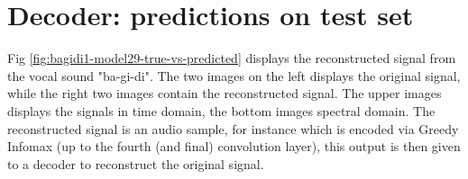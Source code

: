 \section{Decoder: predictions on test set}
Fig \ref{fig:bagidi1-model29-true-vs-predicted} displays the reconstructed signal from the vocal sound "ba-gi-di". The two images on the left displays the original signal, while the right two images contain the reconstructed signal.  The upper images displays the signals in time domain, the bottom images spectral domain. The reconstructed signal is an audio sample, for instance which is encoded via Greedy Infomax (up to the fourth (and final) convolution layer), this output is then given to a decoder to reconstruct the original signal.



